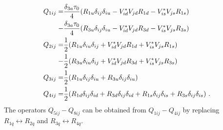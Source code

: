 \begin{align}\label{eq:dependenciesoperators}
	Q_{1ij} =&\frac{\delta_{3a}\tau_{0}}{4}(R_{1u}\delta_{ij}\delta_{iu} - V_{id}^*V_{jd}R_{1d} - V_{is}^*V_{js}R_{1s})\notag \\
	-&\frac{\delta_{3a}\tau_{0}}{4} (R_{3u}\delta_{ij}\delta_{iu} - V_{id}^*V_{jd}R_{3d} - V_{is}^*V_{js}R_{3s})\notag \\
	Q_{2ij} =&\frac{1}{2}(R_{1u}\delta_{iu}\delta_{ij}+ V_{id}^*V_{jd}R_{1d}+ V_{is}^*V_{js}R_{1s})\notag \\
	-&\frac{1}{2}(R_{3u}\delta_{iu}\delta_{ij} + V_{id}^*V_{jd}R_{3d} + V_{is}^*V_{js}R_{3s})\notag \\
	Q_{3ij} =&\frac{1}{2}(R_{1u}\delta_{ij}\delta_{iu} + R_{3u}\delta_{ij}\delta_{iu})\notag \\
	Q_{4ij} =&\frac{1}{2}(R_{1d}\delta_{ij}\delta_{id} + R_{3d}\delta_{ij}\delta_{id} + R_{1s}\delta_{ij}\delta_{is} + R_{3s}\delta_{ij}\delta_{is}) \ .
\end{align}
The operators $Q_{5ij}-Q_{8ij}$ can be obtained from $Q_{1ij}-Q_{4ij}$ by replacing $R_{1q}\leftrightarrow R_{2q}$ and $R_{3q}\leftrightarrow R_{4q}$.



